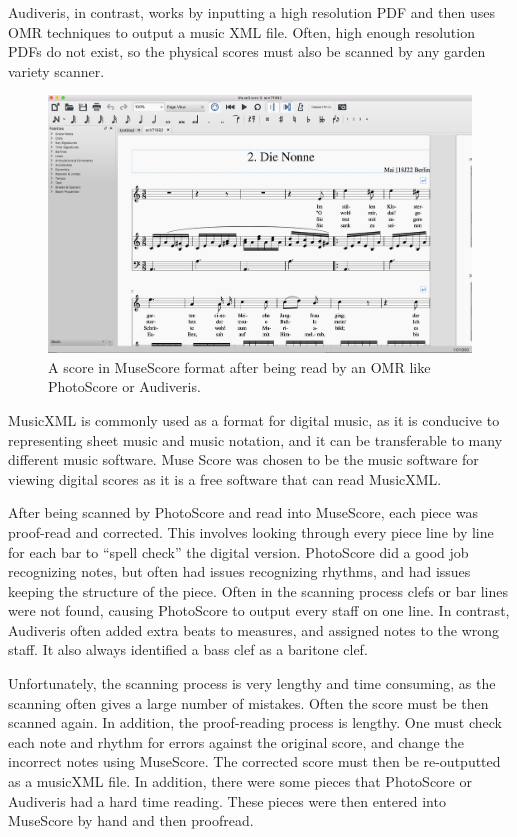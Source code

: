 \documentclass[12pt,twoside]{reedthesis}
\theoremstyle{definition}
\theoremstyle{definition}
\theoremstyle{definition}
\theoremstyle{remark}
\begin{document}
Audiveris, in contrast, works by inputting a high resolution PDF and
then uses OMR techniques to output a music XML file. Often, high enough
resolution PDFs do not exist, so the physical scores must also be
scanned by any garden variety scanner.
\begin{figure}[h]
\centering
\includegraphics[scale=.30]{images/museScore.png}
\caption{A score in MuseScore format after being read by an OMR like PhotoScore or Audiveris.}
\label{subd}
\end{figure}
MusicXML is commonly used as a format for digital music, as it is
conducive to representing sheet music and music notation, and it can be
transferable to many different music software. Muse Score was chosen to
be the music software for viewing digital scores as it is a free
software that can read MusicXML.

After being scanned by PhotoScore and read into MuseScore, each piece
was proof-read and corrected. This involves looking through every piece
line by line for each bar to ``spell check'' the digital version.
PhotoScore did a good job recognizing notes, but often had issues
recognizing rhythms, and had issues keeping the structure of the piece.
Often in the scanning process clefs or bar lines were not found, causing
PhotoScore to output every staff on one line. In contrast, Audiveris
often added extra beats to measures, and assigned notes to the wrong
staff. It also always identified a bass clef as a baritone clef.

Unfortunately, the scanning process is very lengthy and time consuming,
as the scanning often gives a large number of mistakes. Often the score
must be then scanned again. In addition, the proof-reading process is
lengthy. One must check each note and rhythm for errors against the
original score, and change the incorrect notes using MuseScore. The
corrected score must then be re-outputted as a musicXML file. In
addition, there were some pieces that PhotoScore or Audiveris had a hard
time reading. These pieces were then entered into MuseScore by hand and
then proofread.
\end{document}
